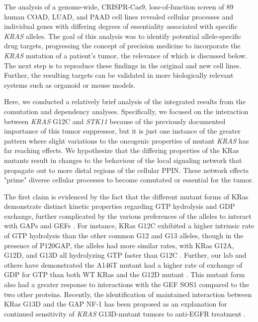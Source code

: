 \documentclass[english, 10pt, letterpaper]{article}
\newcommand{\KRAS}{\emph{KRAS}}
\newcommand{\kras}{KRas}
\begin{document}
The analysis of a genome-wide, CRISPR-Cas9, loss-of-function screen of 89 human COAD, LUAD, and PAAD cell lines revealed cellular processes and individual genes with differing degrees of essentiality associated with specific \KRAS{} alleles.
The goal of this analysis was to identify potential allele-specific drug targets, progressing the concept of precision medicine to incorporate the \KRAS{} mutation of a patient's tumor, the relevance of which is discussed below.
The next step is to reproduce these findings in the original and new cell lines.
Further, the resulting targets can be validated in more biologically relevant systems such as organoid or mouse models.

Here, we conducted a relatively brief analysis of the integrated results from the comutation and dependency analyses.
Specifically, we focused on the interaction between \KRAS{} G12C and \emph{STK11} because of the previously documented importance of this tumor suppressor, but it is just one instance of the greater pattern where slight variations to the oncogenic properties of mutant \KRAS{} has far reaching effects.
We hypothesize that the differing properties of the \kras{} mutants result in changes to the behaviour of the local signaling network that propagate out to more distal regions of the cellular PPIN.
These network effects "prime" diverse cellular processes to become comutated or essential for the tumor.

The first claim is evidenced by the fact that the different mutant forms of \kras{} demonstrate distinct kinetic properties regarding GTP hydrolysis and GDP exchange, further complicated by the various preferences of the alleles to interact with GAPs and GEFs \cite{Smith2013, Hunter2015a}.
For instance, \kras{} G12C exhibited a higher intrinsic rate of GTP hydrolysis than the other common G12 and G13 alleles, though in the presence of P120GAP, the alleles had more similar rates, with \kras{} G12A, G12D, and G13D all hydrolyzing GTP faster than G12C \cite{Hunter2015a}.
Further, our lab and others have demonstrated the A146T mutant had a higher rate of exchange of GDP for GTP than both WT \kras{} and the G12D mutant \cite{Feig1988RelationshipProteins., Edkins2006, Janakiraman2010, Poulin2019}.
This mutant form also had a greater response to interactions with the GEF SOS1 compared to the two other proteins.
Recently, the identification of maintained interaction between \kras{} G13D and the GAP NF-1 has been proposed as an explanation for continued sensitivity of \KRAS{} G13D-mutant tumors to anti-EGFR treatment \cite{McFall2019, Rabara2019, Zafra2019}.
\end{document}
